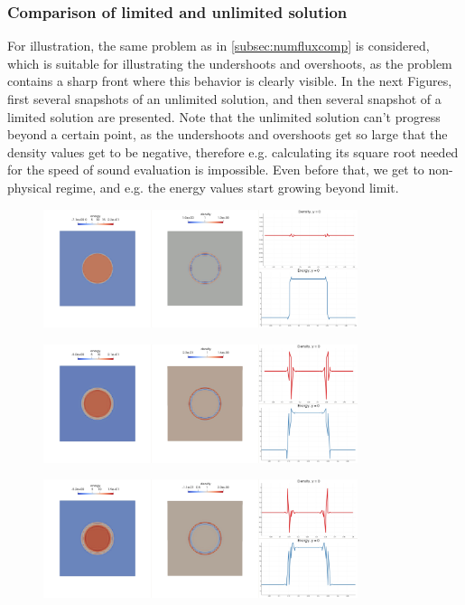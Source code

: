 \subsubsection{Comparison of limited and unlimited solution}
For illustration, the same problem as in \cref{subsec:numfluxcomp} is considered, which is suitable for illustrating the undershoots and overshoots, as the problem contains a sharp front where this behavior is clearly visible.
In the next Figures, first several snapshots of an unlimited solution, and then several snapshot of a limited solution are presented. Note that the unlimited solution can't progress beyond a certain point, as the undershoots and overshoots get so large that the density values get to be negative, therefore e.g. calculating its square root needed for the speed of sound evaluation is impossible. Even before that, we get to non-physical regime, and e.g. the energy values start growing beyond limit.
\begin{figure}[H]
		\begin{center}
			\includegraphics[width=0.82\textwidth]{img/limit/nl1.jpg}
		\end{center}
	\end{figure}\vspace{-12mm}
	\begin{figure}[H]
		\begin{center}
			\includegraphics[width=0.82\textwidth]{img/limit/nl2.jpg}
		\end{center}
	\end{figure}\vspace{-12mm}
	\begin{figure}[H]
		\begin{center}
			\includegraphics[width=0.82\textwidth]{img/limit/nl3.jpg}
		\end{center}
	\end{figure}\vspace{-12mm}
